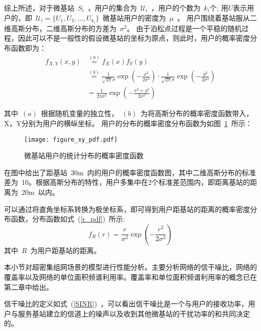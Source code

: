 综上所述，对于微基站~$S_i$~，用户的集合为~$\mathcal{U}_i$~，用户的个数为~$k_i$个, 用$U$表示用户的，即~$\mathcal{U}_i=\{U_1, U_2, ..., U_{k_i}\}$~微基站用户的密度为~$\mu$~。
用户围绕着基站服从二维高斯分布，二维高斯分布的方差为~$\sigma^2$。
由于泊松点过程是一个平稳的随机过程，因此可以不是一般性的假设微基站的坐标为原点，则此时，用户的概率密度分布函数即为：
\begin{equation}
  \begin{aligned}
  f_{X,Y}(x,y) &\overset{(a)}{=} f_X(x) f_Y(y) \\
               &\overset{(b)}{=} \frac{1}{\sqrt{2\pi}\sigma}\exp\left(-\frac{x^2}{2\sigma^2}\right)\cdot\frac{1}{\sqrt{2\pi}\sigma}\exp\left(-\frac{y^2}{2\sigma^2}\right) \\
               &=\frac{1}{2\pi\sigma^2}\exp\left(-\frac{x^2+y^2}{2\sigma^2}\right)
  \end{aligned}
\end{equation}

其中~$(a)$~根据随机变量的独立性，~$(b)$~为将高斯分布的概率密度函数带入，X，Y分别为用户的横纵坐标。
用户的分布的概率密度分布函数为如图~\ref{figure_xy_pdf}~所示：
\begin{figure}[htbp]
\centering
\texttt{[image: figure\_xy\_pdf.pdf]}
\caption{微基站用户的统计分布的概率密度函数}\vspace{-0.5em}
\label{figure_xy_pdf}
\end{figure}

在图中给出了距基站~30m~内的用户的概率密度函数图，其中二维高斯分布的标准差为~10。根据高斯分布的特性，用户多集中在2个标准差范围内，即距离基站的距离为~20m~以内。

可以通过将直角坐标系转换为极坐标系，即可得到用户距基站的距离的概率密度分布函数，分布函数如式~(\ref{r_pdf})~所示:
\begin{equation}\label{r_pdf}
  f_R(r) = \frac{r}{\sigma^2}\exp(-\frac{r^2}{2\sigma^2})
\end{equation}
其中~$R$~为用户距基站的距离。


本小节对超密集组网场景的模型进行性能分析。主要分析网络的信干噪比，网络的覆盖率以及网络的单位面积频谱利用率。覆盖率和单位面积频谱利用率的概念已在第二章中给出。




信干噪比的定义如式~(\ref{SINR})~，可以看出信干噪比是一个与用户的接收功率，用户与服务基站建立的信道上的噪声以及收到其他微基站的干扰功率的和共同决定的。

